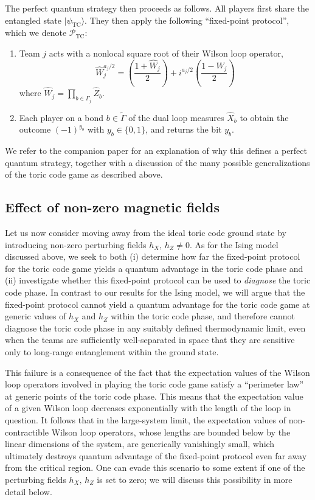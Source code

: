 \documentclass[prb,twocolumn,showpacs,amssymb,superscriptaddress]{revtex4-2}
\begin{document}
The perfect quantum strategy then proceeds as follows. All players first share the entangled state $|\psi_{\mathrm{TC}}\rangle$. They then apply the following ``fixed-point protocol'', which we denote $\mathcal{P}_{\mathrm{TC}}$:
\begin{enumerate}
    \item Team $j$ acts with a nonlocal square root of their Wilson loop operator,
    \begin{equation}
    \hat{W}_j^{a_j/2} = \left(\frac{1+\hat{W}_j}{2}\right) + i^{a_j/2}\left(\frac{1-\hat{W}_j}{2}\right)
    \end{equation}
    where $\hat{W}_j = \prod_{b \in \Gamma_j} \hat{Z}_b$.
    \item Each player on a bond $b \in \widetilde{\Gamma}$ of the dual loop measures $\hat{X}_b$ to obtain the outcome $(-1)^{y_b}$ with $y_b \in \{0,1\}$, and returns the bit $y_b$.
\end{enumerate}
We refer to the companion paper\cite{companion} for an explanation of why this defines a perfect quantum strategy, together with a discussion of the many possible generalizations of the toric code game as described above.

\subsection{Effect of non-zero magnetic fields}
Let us now consider moving away from the ideal toric code ground state by introducing non-zero perturbing fields $h_X, \, h_Z \neq 0$. As for the Ising model discussed above, we seek to both (i) determine how far the fixed-point protocol for the toric code game yields a quantum advantage in the toric code phase and (ii) investigate whether this fixed-point protocol can be used to \emph{diagnose} the toric code phase. In contrast to our results for the Ising model, we will argue that the fixed-point protocol cannot yield a quantum advantage for the toric code game at generic values of $h_X$ and $h_Z$ within the toric code phase, and therefore cannot diagnose the toric code phase in any suitably defined thermodynamic limit, even when the teams are sufficiently well-separated in space that they are sensitive only to long-range entanglement within the ground state.

This failure is a consequence of the fact that the expectation values of the Wilson loop operators involved in playing the toric code game satisfy a ``perimeter law'' at generic points of the toric code phase. This means that the expectation value of a given Wilson loop decreases exponentially with the length of the loop in question. It follows that in the large-system limit, the expectation values of non-contractible Wilson loop operators, whose lengths are bounded below by the linear dimensions of the system, are generically vanishingly small, which ultimately destroys quantum advantage of the fixed-point protocol even far away from the critical region. One can evade this scenario to some extent if one of the perturbing fields $h_X, \, h_Z$ is set to zero; we will discuss this possibility in more detail below.
\end{document}
